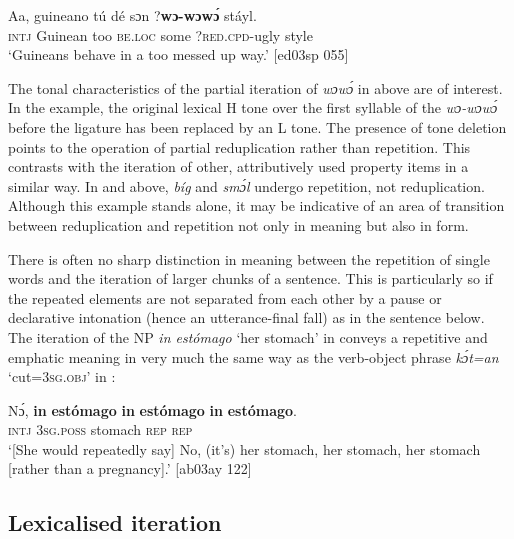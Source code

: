 \z


\ea%
    \label{ex:key:161}
    \gll Aa,  guineano  tú  dé    sɔn    ?\textbf{wɔ-wɔwɔ́}  stáyl.\\
\textsc{intj}  Guinean    too  \textsc{be.loc}  some  ?\textsc{red.cpd}{}-ugly  style\\

\glt ‘Guineans behave in a too messed up way.’ [ed03sp 055]
\z

The tonal characteristics of the partial iteration of \textit{wɔwɔ́} in  above are of interest. In the example, the original lexical H tone over the first syllable of the \textit{wɔ-wɔwɔ́} before the ligature has been replaced by an L tone. The presence of tone deletion points to the operation of partial reduplication rather than repetition. This contrasts with the iteration of other, attributively used property items in a similar way. In  and  above, \textit{bíg} and \textit{smɔ́l} undergo repetition, not reduplication. Although this example stands alone, it may be indicative of an area of transition between reduplication and repetition not only in meaning but also in form. 


There is often no sharp distinction in meaning between the repetition of single words and the iteration of larger chunks of a sentence. This is particularly so if the repeated elements are not separated from each other by a pause or declarative intonation (hence an utterance-final fall) as in the sentence below. The iteration of the NP \textit{in estómago} ‘her stomach’ in  conveys a repetitive and emphatic meaning in very much the same way as the verb-object phrase \textit{kɔ́t=an} ‘cut=\textsc{3sg.obj}’ in : 



\ea%
    \label{ex:key:162}
    \gll Nɔ́,  \textbf{in}    \textbf{estómago}  {\textbf{in}  \textbf{estómago}}  {\textbf{in}  \textbf{estómago}}.\\
\textsc{intj}  \textsc{3sg.poss}  stomach    \textsc{rep}        \textsc{rep}\\

\glt ‘[She would repeatedly say] No, (it’s) her stomach, her stomach, her stomach [rather than a pregnancy].’ [ab03ay 122]
\z

\subsection{Lexicalised iteration}\label{sec:4.5.3}

